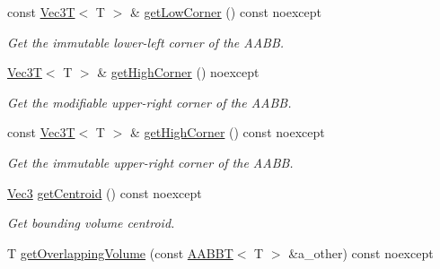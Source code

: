 \begin{DoxyCompactItemize}
const \hyperlink{classVec3T}{Vec3T}$<$ T $>$ \& \hyperlink{classEBGeometry_1_1BoundingVolumes_1_1AABBT_af18ddf4d7aec12a5815d1a7311d73211}{get\+Low\+Corner} () const noexcept
\begin{DoxyCompactList}\small\item\em Get the immutable lower-\/left corner of the A\+A\+BB. \end{DoxyCompactList}\item 
\mbox{\label{classEBGeometry_1_1BoundingVolumes_1_1AABBT_aea8039465165dd67f8fe22161b3ccd7b}} 
\hyperlink{classVec3T}{Vec3T}$<$ T $>$ \& \hyperlink{classEBGeometry_1_1BoundingVolumes_1_1AABBT_aea8039465165dd67f8fe22161b3ccd7b}{get\+High\+Corner} () noexcept
\begin{DoxyCompactList}\small\item\em Get the modifiable upper-\/right corner of the A\+A\+BB. \end{DoxyCompactList}\item 
\mbox{\label{classEBGeometry_1_1BoundingVolumes_1_1AABBT_adb0215acdc4b494b9934cbf625394d24}} 
const \hyperlink{classVec3T}{Vec3T}$<$ T $>$ \& \hyperlink{classEBGeometry_1_1BoundingVolumes_1_1AABBT_adb0215acdc4b494b9934cbf625394d24}{get\+High\+Corner} () const noexcept
\begin{DoxyCompactList}\small\item\em Get the immutable upper-\/right corner of the A\+A\+BB. \end{DoxyCompactList}\item 
\mbox{\label{classEBGeometry_1_1BoundingVolumes_1_1AABBT_a74542ab67572055ef6559bcc6c0335f9}} 
\hyperlink{classEBGeometry_1_1BoundingVolumes_1_1AABBT_af139f618de2c5138990a63e93eb7d066}{Vec3} \hyperlink{classEBGeometry_1_1BoundingVolumes_1_1AABBT_a74542ab67572055ef6559bcc6c0335f9}{get\+Centroid} () const noexcept
\begin{DoxyCompactList}\small\item\em Get bounding volume centroid. \end{DoxyCompactList}\item 
T \hyperlink{classEBGeometry_1_1BoundingVolumes_1_1AABBT_a02d157786ad67971b4873d6c2b33adbf}{get\+Overlapping\+Volume} (const \hyperlink{classEBGeometry_1_1BoundingVolumes_1_1AABBT}{A\+A\+B\+BT}$<$ T $>$ \&a\+\_\+other) const noexcept

\end{DoxyCompactItemize}
